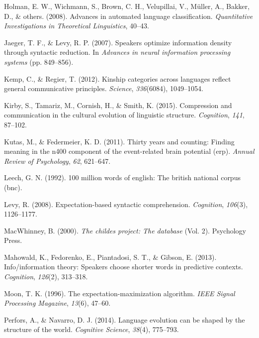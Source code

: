 \documentclass[man,floatsintext]{apa6}
\begin{document}
\leavevmode\hypertarget{ref-holman2008}{}%
Holman, E. W., Wichmann, S., Brown, C. H., Velupillai, V., Müller, A., Bakker, D., \& others. (2008). Advances in automated language classification. \emph{Quantitative Investigations in Theoretical Linguistics}, 40--43.

\leavevmode\hypertarget{ref-jaeger2007}{}%
Jaeger, T. F., \& Levy, R. P. (2007). Speakers optimize information density through syntactic reduction. In \emph{Advances in neural information processing systems} (pp. 849--856).

\leavevmode\hypertarget{ref-kemp2012kinship}{}%
Kemp, C., \& Regier, T. (2012). Kinship categories across languages reflect general communicative principles. \emph{Science}, \emph{336}(6084), 1049--1054.

\leavevmode\hypertarget{ref-kirby2015compression}{}%
Kirby, S., Tamariz, M., Cornish, H., \& Smith, K. (2015). Compression and communication in the cultural evolution of linguistic structure. \emph{Cognition}, \emph{141}, 87--102.

\leavevmode\hypertarget{ref-kutas2011}{}%
Kutas, M., \& Federmeier, K. D. (2011). Thirty years and counting: Finding meaning in the n400 component of the event-related brain potential (erp). \emph{Annual Review of Psychology}, \emph{62}, 621--647.

\leavevmode\hypertarget{ref-leech1992}{}%
Leech, G. N. (1992). 100 million words of english: The british national corpus (bnc).

\leavevmode\hypertarget{ref-levy2008}{}%
Levy, R. (2008). Expectation-based syntactic comprehension. \emph{Cognition}, \emph{106}(3), 1126--1177.

\leavevmode\hypertarget{ref-macwhinney2000}{}%
MacWhinney, B. (2000). \emph{The childes project: The database} (Vol. 2). Psychology Press.

\leavevmode\hypertarget{ref-mahowald2013}{}%
Mahowald, K., Fedorenko, E., Piantadosi, S. T., \& Gibson, E. (2013). Info/information theory: Speakers choose shorter words in predictive contexts. \emph{Cognition}, \emph{126}(2), 313--318.

\leavevmode\hypertarget{ref-moon1996}{}%
Moon, T. K. (1996). The expectation-maximization algorithm. \emph{IEEE Signal Processing Magazine}, \emph{13}(6), 47--60.

\leavevmode\hypertarget{ref-perfors2014language}{}%
Perfors, A., \& Navarro, D. J. (2014). Language evolution can be shaped by the structure of the world. \emph{Cognitive Science}, \emph{38}(4), 775--793.
\end{document}
